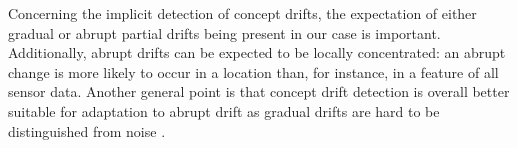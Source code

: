 







Concerning the implicit detection of concept drifts, the expectation of either gradual or abrupt partial drifts being present in our case is important. Additionally, abrupt drifts can be expected to be locally concentrated: an abrupt change is more likely to occur in a location than, for instance, in a feature of all sensor data. Another general point is that concept drift detection is overall better suitable for adaptation to abrupt drift as gradual drifts are hard to be distinguished from noise \cite{zliobaite_driftsurvey}. 

